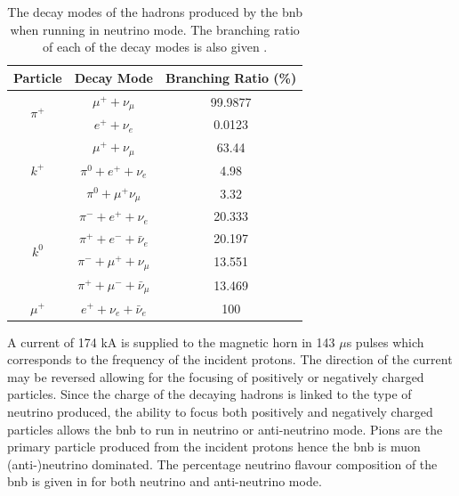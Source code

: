 \begin{table}[h]
\begin{tabular}{ccc}
Particle                 & Decay Mode                        & Branching Ratio (\%) \\ \hline
\multirow{2}{*}{$\pi^+$} & $\mu^+ + \nu_{\mu}$               & 99.9877             \\
                         & $e^+ + \nu_e$                     & 0.0123              \\ \hline
\multirow{3}{*}{$k^+$}   & $\mu^+ + \nu_{\mu}$               & 63.44               \\
                         & $\pi^0 + e^+ + \nu_e$             & 4.98                \\
                         & $\pi^0 + \mu^+ \nu_{\mu}$         & 3.32                \\ \hline
\multirow{4}{*}{$k^0$}   & $\pi^- + e^+ + \nu_e$             & 20.333              \\
                         & $\pi^+ + e^- + \bar{\nu}_e$         & 20.197              \\
                         & $\pi^- + \mu^+ + \nu_{\mu}$       & 13.551              \\
                         & $\pi^+ + \mu^- + \bar{\nu}_{\mu}$ & 13.469              \\ \hline
$\mu^+$                   & $e^+ + \nu_e + \bar{\nu}_e$       & 100                
\end{tabular}
\caption[Hadron decay mode in the BNB.]{The decay modes of the hadrons produced by the \gls{bnb} when running in neutrino mode. The branching ratio of each of the decay modes is also given \cite{BNB_flux}.}
\label{Table: BNB decay modes}
\end{table}

\newpage
A current of 174 kA is supplied to the magnetic horn in 143 $\mu$s pulses which corresponds to the frequency of the incident protons. The direction of the current may be reversed allowing for the focusing of positively or negatively charged particles. Since the charge of the decaying hadrons is linked to the type of neutrino produced, the ability to focus both positively and negatively charged particles allows the \gls{bnb} to run in neutrino or anti-neutrino mode. Pions are the primary particle produced from the incident protons hence the \gls{bnb} is muon (anti-)neutrino dominated. The percentage neutrino flavour composition of the \gls{bnb} is given in  for both neutrino and anti-neutrino mode.


